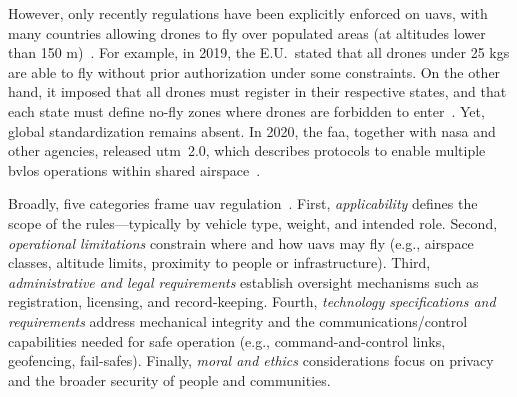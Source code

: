 However, only recently regulations have been explicitly enforced on \glspl{uav},
with many countries allowing drones to fly over populated areas (at altitudes
lower than 150 m)~\cite{nassi2021sok}. For example, in 2019, the E.U.~stated that all drones under
25 kgs are able to fly without prior authorization under some constraints. On
the other hand, it imposed that all drones must register in their respective
states, and that each state must define no-fly zones where drones are
forbidden to enter~\cite{Ullah2020UAV5gEULegisl}.
%
Yet, global standardization remains absent. In 2020, the \gls{faa}, together with \gls{nasa} and other agencies, released \gls{utm}~2.0, which describes protocols to enable multiple \gls{bvlos} operations within shared airspace~\cite{glossner2021overview}.

Broadly, five categories frame \gls{uav}
regulation~\cite{fotouhi2019UAVCellularCommSurvey,stocker2017UAVRegulationsReview}. First,
\emph{applicability} defines the scope of the rules—typically by vehicle type, weight,
and intended role. Second, \emph{operational limitations} constrain where and how
\glspl{uav} may fly (e.g., airspace classes, altitude limits, proximity to
people or infrastructure). Third, \emph{administrative and legal requirements}
establish oversight mechanisms such as registration, licensing, and
record-keeping. Fourth, \emph{technology specifications and requirements} address
mechanical integrity and the communications/control capabilities needed for safe
operation (e.g., command-and-control links, geofencing, fail-safes). Finally,
\emph{moral and ethics} considerations focus on privacy and the broader security
of people and communities.



